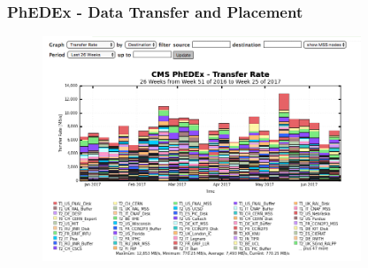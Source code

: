 \begin{frame}
\frametitle{PhEDEx - Data Transfer and Placement}

\begin{figure}[htbp]
\begin{center}
\includegraphics[width=0.85\textwidth]{images/phedex-transfers-2017-2.png}
\end{center}
\end{figure}


\end{frame}


